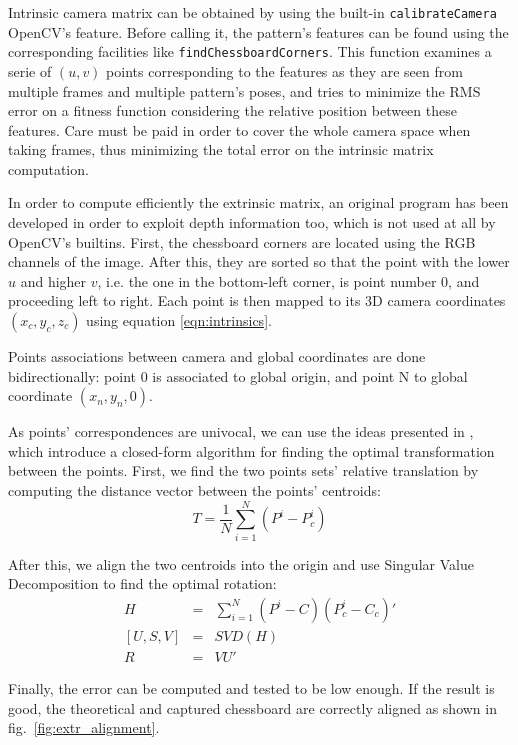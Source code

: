 Intrinsic camera matrix can be obtained by using the built-in
\texttt{calibrateCamera} OpenCV's feature.
Before calling it, the pattern's features can be found using the corresponding
facilities like \texttt{findChessboardCorners}. This function examines a serie
of $(u,v)$ points corresponding to the features as they are seen from multiple
frames and multiple pattern's poses, and tries to minimize the RMS error on a
fitness function considering the relative position between these features. Care
must be paid in order to cover the whole camera space when taking frames, thus
minimizing the total error on the intrinsic matrix computation.

In order to compute efficiently the extrinsic matrix, an original program has
been developed in order to exploit depth information too, which is not used at
all by OpenCV's builtins. First, the chessboard corners are located using the RGB
channels of the image. After this, they are sorted so that the point with the
lower $u$ and higher $v$, i.e. the one in the bottom-left corner, is point
number 0, and proceeding left to right. Each point is then mapped to its 3D
camera coordinates $(x_c,y_c,z_c)$ using equation \ref{eqn:intrinsics}. 

Points associations between camera and global coordinates are done
bidirectionally: point 0 is associated to global origin, and point N to global
coordinate $(x_n, y_n, 0)$.

As points' correspondences are univocal, we can use the ideas presented in
\cite{extrinsics-algorithm}, which introduce a closed-form algorithm for finding
the optimal transformation between the points. First, we find the two points sets' relative
translation by computing the distance vector between the points' centroids:
\begin{equation}
  T=\frac{1}{N}\sum_{i=1}^{N}(P^i-P_c^i)
\end{equation}

After this, we align the two centroids into the origin and use Singular Value
Decomposition to find the optimal rotation:
\begin{eqnarray}
  H &=& \sum_{i=1}^{N} (P^i - C)(P_c^i - C_c)' \\
  \left[U,S,V\right] &=& SVD(H) \\
  R &=& VU'
\end{eqnarray}

Finally, the error can be computed and tested to be low enough. If the result is
good, the theoretical and captured chessboard are correctly aligned as shown in
fig.~\ref{fig:extr_alignment}.

